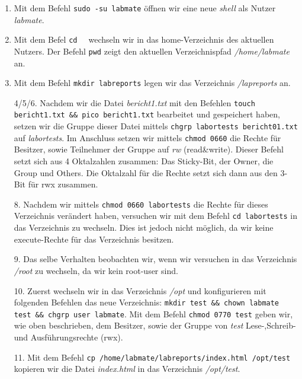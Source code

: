 \documentclass{scrartcl}
\begin{document}
    \begin{enumerate}[1.]
      \item Mit dem Befehl \texttt{sudo -su labmate} öffnen wir eine neue \textit{shell}
            als Nutzer \textit{labmate}.
      \item Mit dem Befel \texttt{cd ~} wechseln wir in das home-Verzeichnis des
            aktuellen Nutzers. Der Befehl \texttt{pwd} zeigt den aktuellen
            Verzeichnispfad \textit{/home/labmate} an.
      \item Mit dem Befehl \texttt{mkdir labreports} legen wir das Verzeichnis
            \textit{/lapreports} an.
      \item [4/5/6.] Nachdem wir die Datei \textit{bericht1.txt} mit den Befehlen
            \texttt{touch bericht1.txt \&\& pico bericht1.txt} bearbeitet und
            gespeichert haben, setzen wir die Gruppe dieser Datei mittels
            \texttt{chgrp labortests bericht01.txt} auf \textit{labortests}.
            Im Anschluss setzen wir mittels \texttt{chmod 0660} die Rechte für
            Besitzer, sowie Teilnehmer der Gruppe auf \textit{rw} (read\&write).
            Dieser Befehl setzt sich aus 4 Oktalzahlen zusammen: Das Sticky-Bit,
            der Owner, die Group und Others. Die Oktalzahl für die Rechte setzt sich
            dann aus den 3-Bit für rwx zusammen.
      \item [8.] Nachdem wir mittels \texttt{chmod 0660 labortests} die Rechte für
            dieses Verzeichnis verändert haben, versuchen wir mit dem Befehl
            \texttt{cd labortests} in das Verzeichnis zu wechseln. Dies ist jedoch
            nicht möglich, da wir keine execute-Rechte für das Verzeichnis besitzen.
      \item [9.] Das selbe Verhalten beobachten wir, wenn wir versuchen in das Verzeichnis
            \textit{/root} zu wechseln, da wir kein root-user sind.
      \item [10.] Zuerst wechseln wir in das Verzeichnis \textit{/opt} und konfigurieren
            mit folgenden Befehlen das neue Verzeichnis:
            \texttt{mkdir test \&\& chown labmate test \&\& chgrp user labmate}.
            Mit dem Befehl \texttt{chmod 0770 test} geben wir, wie oben beschrieben,
            dem Besitzer, sowie der Gruppe von \textit{test} Lese-,Schreib- und
            Ausführungsrechte (rwx).
      \item [11.] Mit dem Befehl \texttt{cp /home/labmate/labreports/index.html /opt/test}
            kopieren wir die Datei \textit{index.html} in das Verzeichnis \textit{/opt/test}.

\end{enumerate}
\end{document}
